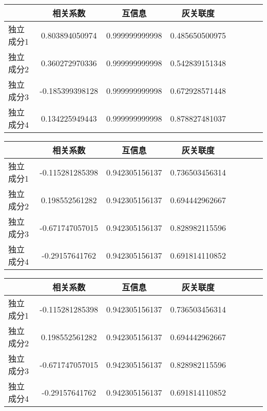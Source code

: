 \begin{table}[!htbp] 
\begin{center}
\begin{tabular}{lccclccc} 
 \toprule 
& 相关系数   & 互信息    &灰关联度 \\ 
\midrule 
独立成分1	& 0.803894050974	& 0.999999999998	& 0.485650500975	\\ 
独立成分2	& 0.360272970336	& 0.999999999998	& 0.542839151348	\\ 
独立成分3	& -0.185399398128	& 0.999999999998	& 0.672928571448	\\ 
独立成分4	& 0.134225949443	& 0.999999999998	& 0.878827481037	\\ 
\bottomrule 
 \end{tabular} 
\end{center} 
 \end{table} 


\begin{table}[!htbp] 
\begin{center}
\begin{tabular}{lccclccc} 
 \toprule 
& 相关系数   & 互信息    &灰关联度 \\ 
\midrule 
独立成分1	& -0.115281285398	& 0.942305156137	& 0.736503456314	\\ 
独立成分2	& 0.198552561282	& 0.942305156137	& 0.694442962667	\\ 
独立成分3	& -0.671747057015	& 0.942305156137	& 0.828982115596	\\ 
独立成分4	& -0.29157641762	& 0.942305156137	& 0.691814110852	\\ 
\bottomrule 
 \end{tabular} 
\end{center} 
 \end{table} 


\begin{table}[!htbp] 
\begin{center}
\begin{tabular}{lccclccc} 
 \toprule 
& 相关系数   & 互信息    &灰关联度 \\ 
\midrule 
独立成分1	& -0.115281285398	& 0.942305156137	& 0.736503456314	\\ 
独立成分2	& 0.198552561282	& 0.942305156137	& 0.694442962667	\\ 
独立成分3	& -0.671747057015	& 0.942305156137	& 0.828982115596	\\ 
独立成分4	& -0.29157641762	& 0.942305156137	& 0.691814110852	\\ 
\bottomrule 
 \end{tabular} 
\end{center} 
 \end{table} 


